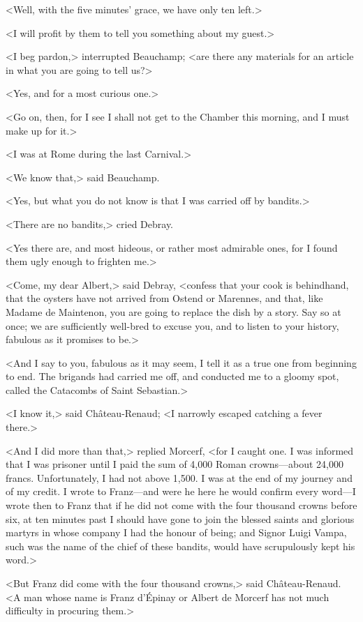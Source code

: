  <Well, with the five minutes' grace, we have only ten left.> 

 <I will profit by them to tell you something about my guest.> 

 <I beg pardon,> interrupted Beauchamp; <are there any materials for an article in what you are going to tell us?> 

 <Yes, and for a most curious one.> 

 <Go on, then, for I see I shall not get to the Chamber this morning, and I must make up for it.> 

 <I was at Rome during the last Carnival.> 

 <We know that,> said Beauchamp. 

 <Yes, but what you do not know is that I was carried off by bandits.> 

 <There are no bandits,> cried Debray. 

 <Yes there are, and most hideous, or rather most admirable ones, for I found them ugly enough to frighten me.> 

 <Come, my dear Albert,> said Debray, <confess that your cook is behindhand, that the oysters have not arrived from Ostend or Marennes, and that, like Madame de Maintenon, you are going to replace the dish by a story. Say so at once; we are sufficiently well-bred to excuse you, and to listen to your history, fabulous as it promises to be.> 

 <And I say to you, fabulous as it may seem, I tell it as a true one from beginning to end. The brigands had carried me off, and conducted me to a gloomy spot, called the Catacombs of Saint Sebastian.> 

 <I know it,> said Château-Renaud; <I narrowly escaped catching a fever there.> 

 <And I did more than that,> replied Morcerf, <for I caught one. I was informed that I was prisoner until I paid the sum of 4,000 Roman crowns—about 24,000 francs. Unfortunately, I had not above 1,500. I was at the end of my journey and of my credit. I wrote to Franz—and were he here he would confirm every word—I wrote then to Franz that if he did not come with the four thousand crowns before six, at ten minutes past I should have gone to join the blessed saints and glorious martyrs in whose company I had the honour of being; and Signor Luigi Vampa, such was the name of the chief of these bandits, would have scrupulously kept his word.> 

 <But Franz did come with the four thousand crowns,> said Château-Renaud. <A man whose name is Franz d'Épinay or Albert de Morcerf has not much difficulty in procuring them.> 

